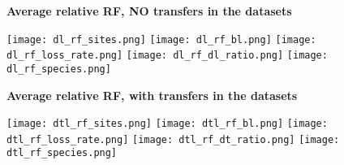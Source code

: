 \documentclass[12pt,a4paper]{article}
\begin{document}
\newcommand*{\figuretitle}[1]{%
    {\centering%
    \textbf{#1}%
    \par\medskip}%
}



\begin{figure}
\figuretitle{Average relative RF, NO transfers in the datasets}
\texttt{[image: dl\_rf\_sites.png]}
\texttt{[image: dl\_rf\_bl.png]}
\texttt{[image: dl\_rf\_loss\_rate.png]}
\texttt{[image: dl\_rf\_dl\_ratio.png]}
\texttt{[image: dl\_rf\_species.png]}
\end{figure}


\begin{figure}
\figuretitle{Average relative RF, with transfers in the datasets}
\texttt{[image: dtl\_rf\_sites.png]}
\texttt{[image: dtl\_rf\_bl.png]}
\texttt{[image: dtl\_rf\_loss\_rate.png]}
\texttt{[image: dtl\_rf\_dt\_ratio.png]}
\texttt{[image: dtl\_rf\_species.png]}
\end{figure}
\end{document}
